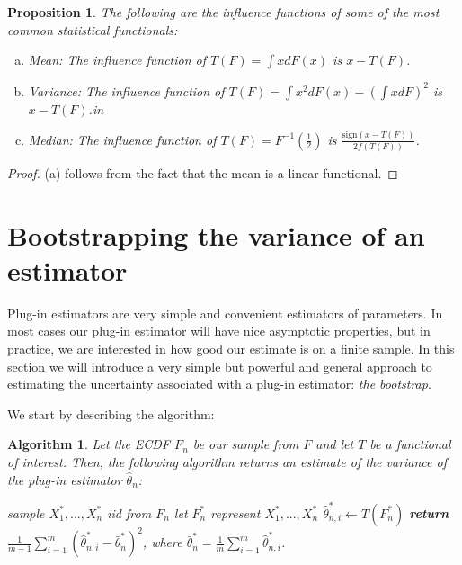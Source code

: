 \documentclass{book}
\theoremstyle{plain}%
\newtheorem{proposition}{Proposition}[section]
\newtheorem{algo}{Algorithm}[section]
\theoremstyle{definition}
\begin{document}
\begin{proposition}

The following are the influence functions of some of the most common statistical functionals:

\begin{enumerate}[(a)]
\item Mean: The influence function of $T(F) = \int x dF(x)$ is $x - T(F)$.
\item Variance: The influence function of $T(F) = \int x^2 dF(x) - (\int x dF)^2$ is $x - T(F)$.in
\item Median: The influence function of $T(F) = F^{-1}(\frac{1}{2})$ is $\frac{\text{sign}(x - T(F))}{2f(T(F))}$.
\end{enumerate}

\end{proposition}

\begin{proof}
(a) follows from the fact that the mean is a linear functional.
\end{proof}


\section{Bootstrapping the variance of an estimator}

Plug-in estimators are very simple and convenient estimators of parameters. In most cases our plug-in estimator will have nice asymptotic properties, but in practice, we are interested in how good our estimate is on a finite sample. In this section we will introduce a very simple but powerful and general approach to estimating the uncertainty associated with a plug-in estimator: \textit{the bootstrap}.

We start by describing the algorithm:

\begin{algo}
Let the ECDF $F_n$ be our sample from $F$ and let $T$ be a functional of interest. Then, the following algorithm returns an estimate of the variance of the plug-in estimator $\hat{\theta}_n$:
\begin{algorithmic}[1]
 
\State sample $X^*_{1},..., X^*_{n}$ iid from $F_n$ 
\State let $F^*_{n}$ represent $X^*_{1},..., X^*_{n}$
                \State $\hat{\theta}^*_{n,i} \gets T(F^*_{n})$
              \EndFor
              \State \textbf{return} $\frac{1}{m - 1} \sum_{i=1}^m \left(\hat{\theta}^*_{n,i} - \bar{\theta}^*_n\right)^2$, where $\bar{\theta}^*_n = \frac{1}{m} \sum_{i=1}^m \hat{\theta}^*_{n,i}$.
        \EndProcedure
    \end{algorithmic}\label{alg:bootstrap}
\end{algo}
\end{document}
